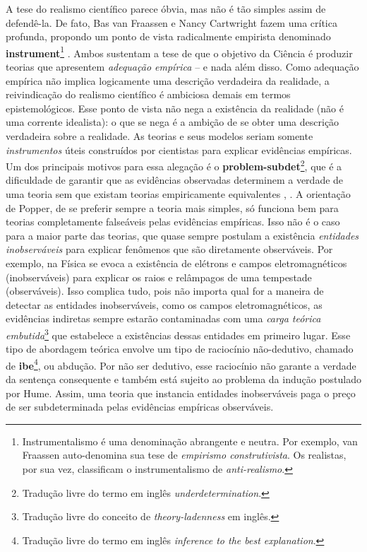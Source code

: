 \documentclass[./main.tex]{subfiles}
\begin{document}
\par A tese do realismo científico parece óbvia, mas não é tão simples assim de defendê-la. De fato, Bas van Fraassen \cite{bas1980} e Nancy Cartwright \cite{nancy1983} fazem uma crítica profunda, propondo um ponto de vista radicalmente empirista denominado \textbf{\gls{instrument}}\footnote{Instrumentalismo é uma denominação  abrangente e neutra. Por exemplo, van Fraassen auto-denomina sua tese de \textit{empirismo construtivista}. Os realistas, por sua vez, classificam o instrumentalismo de \textit{anti-realismo}.} \cite{sep-constructive-empiricism}. Ambos sustentam a tese de que o objetivo da Ciência é produzir teorias que apresentem \textit{adequação empírica} -- e nada além disso. Como adequação empírica não implica logicamente uma descrição verdadeira da realidade, a reivindicação do realismo científico é ambiciosa demais em termos epistemológicos. Esse ponto de vista não nega a existência da realidade (não é uma corrente idealista): o que se nega é a ambição de se obter uma descrição verdadeira sobre a realidade. As teorias e seus modelos seriam somente \textit{instrumentos} úteis construídos por cientistas para explicar evidências empíricas. Um dos principais motivos para essa alegação é o \textbf{\gls{problem-subdet}}\footnote{Tradução livre do termo em inglês \textit{underdetermination}.}, que é a dificuldade de garantir que as evidências observadas determinem a verdade de uma teoria sem que existam teorias empiricamente equivalentes \cite{sep-scientific-underdet}, \cite{Tulodziecki2017}. A orientação de Popper, de se preferir sempre a teoria mais simples, só funciona bem para teorias completamente falseáveis pelas evidências empíricas. Isso não é o caso para a maior parte das teorias, que quase sempre postulam a existência \textit{entidades inobserváveis} para explicar fenômenos que são diretamente observáveis. Por exemplo, na Física se evoca a existência de elétrons e campos eletromagnéticos (inobserváveis) para explicar os raios e relâmpagos de uma tempestade (observáveis). Isso complica tudo, pois não importa qual for a maneira de detectar as entidades inobserváveis, como os campos eletromagnéticos, as evidências indiretas sempre estarão contaminadas com uma \textit{carga teórica embutida}\footnote{Tradução livre do conceito de \textit{theory-ladenness} em inglês.} que estabelece a existências dessas entidades em primeiro lugar. Esse tipo de abordagem teórica envolve um tipo de raciocínio não-dedutivo, chamado de \textbf{\gls{ibe}}\footnote{Tradução livre do termo em inglês \textit{inference to the best explanation}.}, ou abdução. Por não ser dedutivo, esse raciocínio não garante a verdade da sentença consequente e também está sujeito ao problema da indução postulado por Hume. Assim, uma teoria que instancia entidades inobserváveis paga o preço de ser subdeterminada pelas evidências empíricas observáveis.
\end{document}
